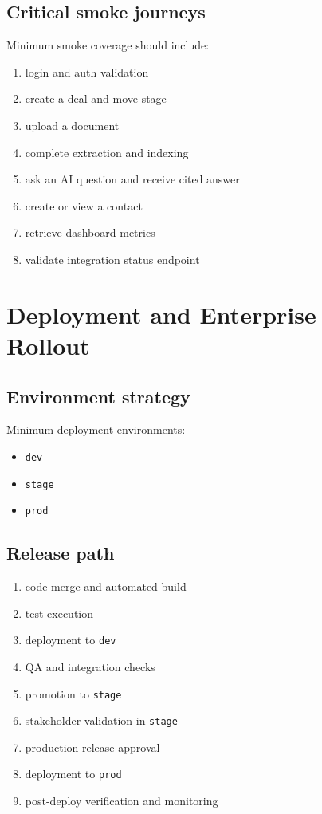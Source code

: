 \documentclass[11pt]{article}
\begin{document}
\subsection{Critical smoke journeys}

Minimum smoke coverage should include:

\begin{enumerate}
\item login and auth validation
\item create a deal and move stage
\item upload a document
\item complete extraction and indexing
\item ask an AI question and receive cited answer
\item create or view a contact
\item retrieve dashboard metrics
\item validate integration status endpoint
\end{enumerate}

\section{Deployment and Enterprise Rollout}

\subsection{Environment strategy}

Minimum deployment environments:

\begin{itemize}
\item \texttt{dev}
\item \texttt{stage}
\item \texttt{prod}
\end{itemize}

\subsection{Release path}

\begin{enumerate}
\item code merge and automated build
\item test execution
\item deployment to \texttt{dev}
\item QA and integration checks
\item promotion to \texttt{stage}
\item stakeholder validation in \texttt{stage}
\item production release approval
\item deployment to \texttt{prod}
\item post-deploy verification and monitoring
\end{enumerate}
\end{document}
